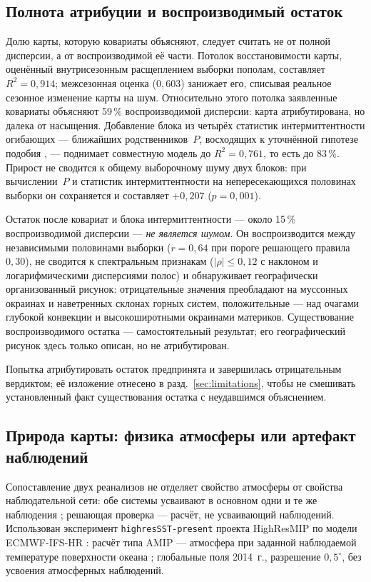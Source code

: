 \documentclass[11pt,a4paper]{article}
\begin{document}
\subsection{Полнота атрибуции и воспроизводимый остаток}
\label{sec:residual}

Долю карты, которую ковариаты объясняют, следует считать не от полной дисперсии, а от воспроизводимой её части. Потолок восстановимости карты, оценённый внутрисезонным расщеплением выборки пополам, составляет $R^2=0{,}914$; межсезонная оценка ($0{,}603$) занижает его, списывая реальное сезонное изменение карты на шум. Относительно этого потолка заявленные ковариаты объясняют 59\,\% воспроизводимой дисперсии: карта атрибутирована, но далека от насыщения. Добавление блока из четырёх статистик интермиттентности огибающих --- ближайших родственников~$P$, восходящих к уточнённой гипотезе подобия \cite{Kolmogorov1962}, --- поднимает совместную модель до $R^2=0{,}761$, то есть до 83\,\%. Прирост не сводится к общему выборочному шуму двух блоков: при вычислении~$P$ и статистик интермиттентности на непересекающихся половинах выборки он сохраняется и составляет $+0{,}207$ ($p=0{,}001$).

Остаток после ковариат и блока интермиттентности --- около 15\,\% воспроизводимой дисперсии --- \emph{не является шумом}. Он воспроизводится между независимыми половинами выборки ($r=0{,}64$ при пороге решающего правила $0{,}30$), не сводится к спектральным признакам ($\lvert\rho\rvert\le0{,}12$ с наклоном и логарифмическими дисперсиями полос) и обнаруживает географически организованный рисунок: отрицательные значения преобладают на муссонных окраинах \cite{RodwellHoskins1996} и наветренных склонах горных систем, положительные --- над очагами глубокой конвекции и высокоширотными окраинами материков. Существование воспроизводимого остатка --- самостоятельный результат; его географический рисунок здесь только описан, но не атрибутирован.

Попытка атрибутировать остаток предпринята и завершилась отрицательным вердиктом; её изложение отнесено в разд.~\ref{sec:limitations}, чтобы не смешивать установленный факт существования остатка с неудавшимся объяснением.

\subsection{Природа карты: физика атмосферы или артефакт наблюдений}
\label{sec:model}

Сопоставление двух реанализов не отделяет свойство атмосферы от свойства наблюдательной сети: обе системы усваивают в основном одни и те же наблюдения \cite{Hersbach2020,Gelaro2017}; решающая проверка --- расчёт, не усваивающий наблюдений. Использован эксперимент \texttt{highresSST-present} проекта HighResMIP \cite{Haarsma2016} по модели ECMWF-IFS-HR \cite{Roberts2018}: расчёт типа AMIP --- атмосфера при заданной наблюдаемой температуре поверхности океана \cite{Gates1992}; глобальные поля 2014~г., разрешение $0{,}5^\circ$, без усвоения атмосферных наблюдений.
\end{document}
